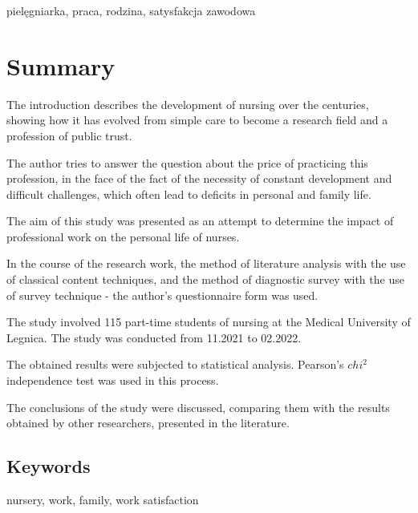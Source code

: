 \documentclass[a4paper,12pt,twoside,openright]{mwrep}
\begin{document}
\vspace{\baselineskip} 

pielęgniarka, praca, rodzina, satysfakcja zawodowa

\chapter*{Summary}

The introduction describes the development of nursing over the centuries, showing how it has evolved from simple care to become a research field and a profession of public trust. 

The author tries to answer the question about the price of practicing this profession, in the face of the fact of the necessity of constant development and difficult challenges, which often lead to deficits in personal and family life. 

The aim of this study was presented as an attempt to determine the impact of professional work on the personal life of nurses.


In the course of the research work, the method of literature analysis with the use of classical content techniques, and the method of diagnostic survey with the use of survey technique - the author's questionnaire form was used. 

The study involved 115 part-time students of nursing at the Medical University of Legnica. The study was conducted from 11.2021 to 02.2022.

The obtained results were subjected to statistical analysis. Pearson's $chi^2$ independence test was used in this process.

The conclusions of the study were discussed, comparing them with the results obtained by other researchers, presented in the literature.
\vspace{\baselineskip} 

\section*{Keywords}

\vspace{\baselineskip} 

nursery, work, family, work satisfaction


%
%


\appendix


\makeatletter 
\renewcommand\@biblabel[1]{#1.~} 
\makeatother
\end{document}
